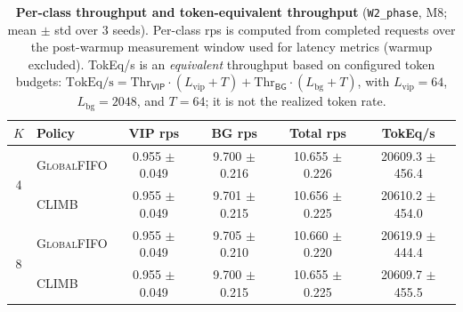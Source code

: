 \begin{table}[t]
\centering
\small
\setlength{\tabcolsep}{6pt}
\caption{\textbf{Per-class throughput and token-equivalent throughput} (\texttt{W2\_phase}, M8; mean $\pm$ std over 3 seeds).
Per-class rps is computed from completed requests over the post-warmup measurement window used for latency metrics (warmup excluded).
TokEq/s is an \emph{equivalent} throughput based on configured token budgets:
$\text{TokEq/s}=\mathrm{Thr}_{\textsf{VIP}}\cdot(L_{\text{vip}}{+}T)+\mathrm{Thr}_{\textsf{BG}}\cdot(L_{\text{bg}}{+}T)$,
with $L_{\text{vip}}{=}64$, $L_{\text{bg}}{=}2048$, and $T{=}64$; it is not the realized token rate.}
\begin{tabular}{c l c c c c}
\toprule
\textbf{$K$} & \textbf{Policy} & \textbf{\textsf{VIP} rps} & \textbf{\textsf{BG} rps} & \textbf{Total rps} & \textbf{TokEq/s} \\
\midrule
\multirow{2}{*}{4}
& \textsc{GlobalFIFO} & 0.955 $\pm$ 0.049 & 9.700 $\pm$ 0.216 & 10.655 $\pm$ 0.226 & 20609.3 $\pm$ 456.4 \\
& \textsc{CLIMB} & 0.955 $\pm$ 0.049 & 9.701 $\pm$ 0.215 & 10.656 $\pm$ 0.225 & 20610.2 $\pm$ 454.0 \\
\midrule
\multirow{2}{*}{8}
& \textsc{GlobalFIFO} & 0.955 $\pm$ 0.049 & 9.705 $\pm$ 0.210 & 10.660 $\pm$ 0.220 & 20619.9 $\pm$ 444.4 \\
& \textsc{CLIMB} & 0.955 $\pm$ 0.049 & 9.700 $\pm$ 0.215 & 10.655 $\pm$ 0.225 & 20609.7 $\pm$ 455.5 \\
\bottomrule
\end{tabular}
\vspace{2pt}


\label{tab:per_class_throughput_tok_eq}
\end{table}
